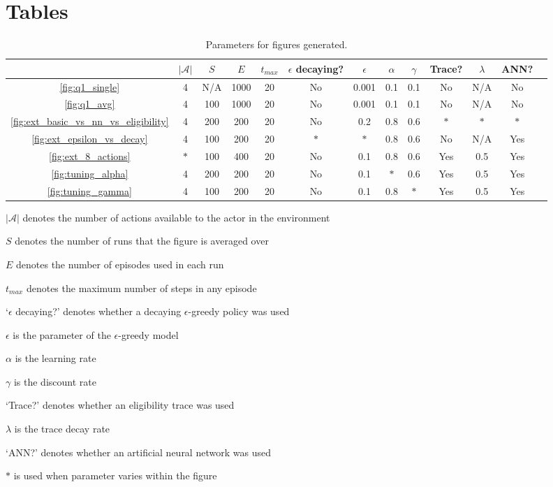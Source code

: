 \documentclass[a4paper, 11pt, twocolumn, final]{article} %
\begin{document}
\section{Tables}
\begin{table}[H]
  \centering
  \begin{tabular}{c | c c c c c c c c c c c c}
    \hline
    & $|\mathcal{A}|$ & $S$ & $E$ & $t_{max}$ & $\epsilon$ decaying? &
      $\epsilon$ & $\alpha$ & $\gamma$ & Trace? & $\lambda$ & ANN? \\
    \hline
    \autoref{fig:q1_single} & 4 & N/A & 1000 & 20 & No & 0.001 & 0.1 & 0.1 &
      No & N/A & No \\
    \autoref{fig:q1_avg} & 4 & 100 & 1000 & 20 & No & 0.001 & 0.1 & 0.1 & No &
      N/A & No \\
    \autoref{fig:ext_basic_vs_nn_vs_eligibility} & 4 & 200 & 200 & 20 & No &
      0.2 & 0.8 & 0.6 & $*$ & $*$ & $*$ \\
    \autoref{fig:ext_epsilon_vs_decay} & 4 & 100 & 200 & 20 & $*$ & $*$ & 0.8 &
      0.6 & No & N/A & Yes \\
    \autoref{fig:ext_8_actions} & $*$ & 100 & 400 & 20 & No & 0.1 & 0.8 & 0.6
      & Yes & 0.5 & Yes \\
    \autoref{fig:tuning_alpha} & 4 & 200 & 200 & 20 & No & 0.1 & $*$ & 0.6 &
      Yes & 0.5 & Yes \\
    \autoref{fig:tuning_gamma} & 4 & 100 & 200 & 20 & No & 0.1 & 0.8 & $*$ &
      Yes & 0.5 & Yes \\
    \hline
  \end{tabular}
  \caption{Parameters for figures generated.}
  \label{tab:parameters}
\end{table}

\begin{itemize*}
  \item $|\mathcal{A}|$ denotes the number of actions available to the actor in
    the environment
  \item $S$ denotes the number of runs that the figure is averaged over
  \item $E$ denotes the number of episodes used in each run
  \item $t_{max}$ denotes the maximum number of steps in any episode
  \item `$\epsilon$ decaying?' denotes whether a decaying $\epsilon$-greedy
    policy was used
  \item $\epsilon$ is the parameter of the $\epsilon$-greedy model
  \item $\alpha$ is the learning rate
  \item $\gamma$ is the discount rate
  \item `Trace?' denotes whether an eligibility trace was used
  \item $\lambda$ is the trace decay rate
  \item `ANN?' denotes whether an artificial neural network was used
  \item $*$ is used when parameter varies within the figure
\end{itemize*}
\end{document}
